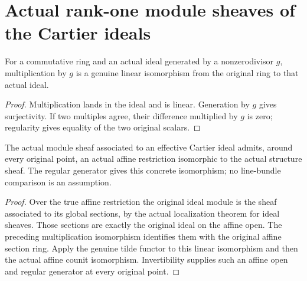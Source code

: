 \section{Actual rank-one module sheaves of the Cartier ideals}

\begin{lemma}
\label{lem:regular-generator-module-equiv}
\leanok
For a commutative ring and an actual ideal generated by a nonzerodivisor
$g$, multiplication by $g$ is a genuine linear isomorphism from the
original ring to that actual ideal.
\end{lemma}
\begin{proof}
Multiplication lands in the ideal and is linear.  Generation by $g$
gives surjectivity.  If two multiples agree, their difference multiplied
by $g$ is zero; regularity gives equality of the two original scalars.
\end{proof}

\begin{lemma}
\label{lem:cartier-ideal-affine-module-trivializations}
\leanok
The actual module sheaf associated to an effective Cartier ideal admits,
around every original point, an actual affine restriction isomorphic to
the actual structure sheaf.  The regular generator gives this concrete
isomorphism; no line-bundle comparison is an assumption.
\end{lemma}
\begin{proof}
Over the true affine restriction the original ideal module is the sheaf
associated to its global sections, by the actual localization theorem
for ideal sheaves.  Those sections are exactly the original ideal on
the affine open.  The preceding multiplication isomorphism identifies
them with the original affine section ring.  Apply the genuine tilde
functor to this linear isomorphism and then the actual affine counit
isomorphism.  Invertibility supplies such an affine open and regular
generator at every original point.
\end{proof}


